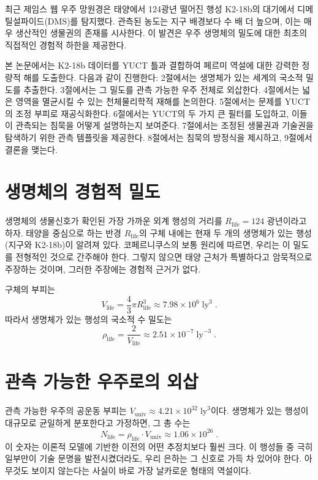 \documentclass[11pt,a4paper]{article}
\begin{document}
	최근 제임스 웹 우주 망원경은 태양에서 124광년 떨어진 행성 K2-18b의 대기에서 디메틸설파이드(DMS)를 탐지했다. 관측된 농도는 지구 배경보다 수 배 더 높으며, 이는 매우 생산적인 생물권의 존재를 시사한다. 이 발견은 우주 생명체의 밀도에 대한 최초의 직접적인 경험적 하한을 제공한다.
	
	본 논문에서는 K2-18b 데이터를 YUCT 틀과 결합하여 페르미 역설에 대한 강력한 정량적 해를 도출한다. 다음과 같이 진행한다: 2절에서는 생명체가 있는 세계의 국소적 밀도를 추출한다. 3절에서는 그 밀도를 관측 가능한 우주 전체로 외삽한다. 4절에서는 넓은 영역을 멸균시킬 수 있는 천체물리학적 재해를 논의한다. 5절에서는 문제를 YUCT의 조정 부피로 재공식화한다. 6절에서는 YUCT의 두 가지 큰 필터를 도입하고, 이들이 관측되는 침묵을 어떻게 설명하는지 보여준다. 7절에서는 조정된 생물권과 기술권을 탐색하기 위한 관측 템플릿을 제공한다. 8절에서는 침묵의 방정식을 제시하고, 9절에서 결론을 맺는다.
	
	\section{생명체의 경험적 밀도}
	\label{sec:empirical}
	생명체의 생물신호가 확인된 가장 가까운 외계 행성의 거리를 \(R_{\mathrm{life}} = 124\) 광년이라고 하자. 태양을 중심으로 하는 반경 \(R_{\mathrm{life}}\)의 구체 내에는 현재 두 개의 생명체가 있는 행성(지구와 K2-18b)이 알려져 있다. 코페르니쿠스의 보통 원리에 따르면, 우리는 이 밀도를 전형적인 것으로 간주해야 한다. 그렇지 않으면 태양 근처가 특별하다고 암묵적으로 주장하는 것이며, 그러한 주장에는 경험적 근거가 없다.
	
	구체의 부피는
	\begin{equation}
		V_{\mathrm{life}} = \frac{4}{3}\pi R_{\mathrm{life}}^{3}
		\approx 7.98\times 10^{6}\;\mathrm{ly}^{3}\; .
	\end{equation}
	따라서 생명체가 있는 행성의 국소적 수 밀도는
	\begin{equation}
		\rho_{\mathrm{life}} = \frac{2}{V_{\mathrm{life}}}
		\approx 2.51\times 10^{-7}\;\mathrm{ly}^{-3}\; .
	\end{equation}
	
	\section{관측 가능한 우주로의 외삽}
	\label{sec:extrapolation}
	관측 가능한 우주의 공운동 부피는 \(V_{\mathrm{univ}} \approx 4.21\times 10^{32}\;\mathrm{ly}^{3}\)이다. 생명체가 있는 행성이 대규모로 균일하게 분포한다고 가정하면, 그 총 수는
	\begin{equation}
		\label{eq:N_life_total}
		N_{\mathrm{life}} = \rho_{\mathrm{life}} \cdot V_{\mathrm{univ}}
		\approx 1.06\times 10^{26}\; .
	\end{equation}
	이 숫자는 이론적 모델에 기반한 이전의 어떤 추정치보다 훨씬 크다. 이 행성들 중 극히 일부만이 기술 문명을 발전시켰더라도, 우리 은하는 그 신호로 가득 차 있어야 한다. 아무것도 보이지 않는다는 사실이 바로 가장 날카로운 형태의 역설이다.
	
\end{document}
